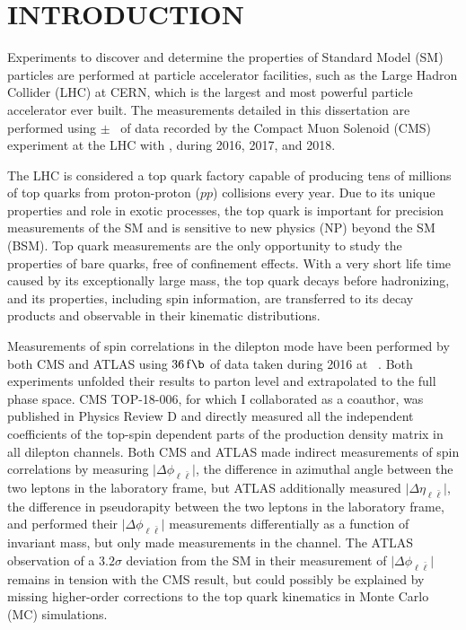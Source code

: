 
\chapter*{INTRODUCTION}
\label{Introduction}
Experiments to discover and determine the properties of Standard Model (SM) particles are performed at particle accelerator facilities, such as the Large Hadron Collider (LHC) at CERN, which is the largest and most powerful particle accelerator ever built.
The measurements detailed in this dissertation are performed using \lumivalueRuniiUL $\pm$ \lumierrRuniiUL\ of data recorded by the Compact Muon Solenoid (CMS) experiment at the LHC with \beamenergy, during 2016, 2017, and 2018.

The LHC is considered a top quark factory capable of producing tens of millions of top quarks from proton-proton ($pp$) collisions every year.
Due to its unique properties and role in exotic processes, the top quark is important for precision measurements of the SM and is sensitive to new physics (NP) beyond the SM (BSM).
Top quark measurements are the only opportunity to study the properties of bare quarks, free of confinement effects.
With a very short life time caused by its exceptionally large mass, the top quark decays before hadronizing, and its properties, including spin information, are transferred to its decay products and observable in their kinematic distributions.

Measurements of \ttbar spin correlations in the dilepton mode have been performed by both CMS and ATLAS using $\SI{36}{\femto \b}$ of data taken during 2016 at \beamenergy~\cite{arxiv.1905.08634}\cite{Sirunyan:2681777}\cite{Aaboud:2667501}.
Both experiments unfolded their results to parton level and extrapolated to the full phase space.
CMS TOP-18-006, for which I collaborated as a coauthor, was published in Physics Review D and directly measured all the independent coefficients of the top-spin dependent parts of the \ttbar production density matrix in all dilepton channels.
Both CMS and ATLAS made indirect measurements of \ttbar spin correlations by measuring $\vert \Delta\phi_{\ell\bar{\ell}} \vert$, the difference in azimuthal angle between the two leptons in the laboratory frame, but ATLAS additionally measured $\vert \Delta\eta_{\ell\bar{\ell}} \vert$, the difference in pseudorapity between the two leptons in the laboratory frame, and performed their $\vert \Delta\phi_{\ell\bar{\ell}} \vert$ measurements differentially as a function of \ttbar invariant mass, but only made measurements in the \emu channel.
The ATLAS observation of a $3.2 \sigma$ deviation from the SM in their measurement of $\vert \Delta\phi_{\ell\bar{\ell}} \vert$ remains in tension with the CMS result, but could possibly be explained by missing higher-order corrections to the top quark kinematics in Monte Carlo (MC) simulations.

